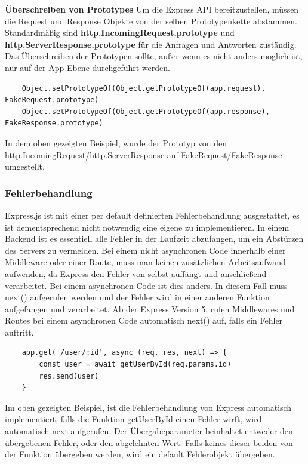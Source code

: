 \textbf{Überschreiben von Prototypes}
\newline
Um die Express API bereitzustellen, müssen die Request und Response Objekte von der selben Prototypenkette abstammen. Standardmäßig sind \textbf{http.IncomingRequest.prototype} und \textbf{http.ServerResponse.prototype} für die Anfragen und Antworten zuständig. Das Überschreiben der Prototypen sollte, außer wenn es nicht anders möglich ist, nur auf der App-Ebene durchgeführt werden.
\begin{lstlisting}
    Object.setPrototypeOf(Object.getPrototypeOf(app.request), FakeRequest.prototype)
    Object.setPrototypeOf(Object.getPrototypeOf(app.response), FakeResponse.prototype)
\end{lstlisting}
In dem oben gezeigten Beispiel, wurde der Prototyp von den http.IncomingRequest/http.ServerResponse auf FakeRequest/FakeResponse umgestellt.
\cite{Express_js_overriding_api}

\subsubsection{Fehlerbehandlung}
Express.js ist mit einer per default definierten Fehlerbehandlung ausgestattet, es ist dementsprechend nicht notwendig eine eigene zu implementieren. In einem Backend ist es essentiell alle Fehler in der Laufzeit abzufangen, um ein Abstürzen des Servers zu vermeiden. Bei einem nicht asynchronen Code innerhalb einer Middleware oder einer Route, muss man keinen zusätzlichen Arbeitsaufwand aufwenden, da Express den Fehler von selbst auffängt und anschließend verarbeitet. Bei einem asynchronen Code ist dies anders. In diesem Fall muss next() aufgerufen werden und der Fehler wird in einer anderen Funktion aufgefangen und verarbeitet. Ab der Express Version 5, rufen Middlewares und Routes bei einem asynchronen Code automatisch next() auf, falls ein Fehler auftritt.
\begin{lstlisting}
    app.get('/user/:id', async (req, res, next) => {
        const user = await getUserById(req.params.id)
        res.send(user)
    }
\end{lstlisting}
Im oben gezeigten Beispiel, ist die Fehlerbehandlung von Express automatisch implementiert, falls die Funktion getUserById einen Fehler wirft, wird automatisch next aufgerufen. Der Übergabeparameter beinhaltet entweder den übergebenen Fehler, oder den abgelehnten Wert. Falls keines dieser beiden von der Funktion übergeben werden, wird ein default Fehlerobjekt übergeben.

